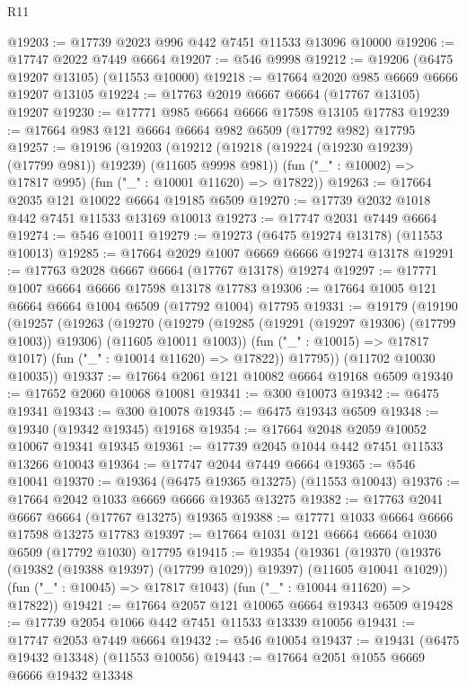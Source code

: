 \begin{lexlean}{R11}
\begin{coremodule}
{{{{{{{{{{{{{{{{{{{{{{{{{{{{{{{{{{{{{{{{{{{{{{{{{{{{{{{{{{{{{{{{{{{{{{{{{{{{{{{{{{@19203 := @17739 @2023 @996 @442 @7451 @11533 @13096 @10000
@19206 := @17747 @2022 @7449 @6664
@19207 := @546 @9998
@19212 := @19206 (@6475 @19207 @13105) (@11553 @10000)
@19218 := @17664 @2020 @985 @6669 @6666 @19207 @13105
@19224 := @17763 @2019 @6667 @6664 (@17767 @13105) @19207
@19230 := @17771 @985 @6664 @6666 @17598 @13105 @17783
@19239 := @17664 @983 @121 @6664 @6664 @982 @6509 (@17792 @982) @17795
@19257 := @19196
    (@19203
      (@19212 (@19218 (@19224 (@19230 @19239) (@17799 @981)) @19239) (@11605 @9998 @981))
      (fun ("_" : @10002) => @17817 @995)
      (fun ("_" : @10001 @11620) => @17822))
@19263 := @17664 @2035 @121 @10022 @6664 @19185 @6509
@19270 := @17739 @2032 @1018 @442 @7451 @11533 @13169 @10013
@19273 := @17747 @2031 @7449 @6664
@19274 := @546 @10011
@19279 := @19273 (@6475 @19274 @13178) (@11553 @10013)
@19285 := @17664 @2029 @1007 @6669 @6666 @19274 @13178
@19291 := @17763 @2028 @6667 @6664 (@17767 @13178) @19274
@19297 := @17771 @1007 @6664 @6666 @17598 @13178 @17783
@19306 := @17664 @1005 @121 @6664 @6664 @1004 @6509 (@17792 @1004) @17795
@19331 := @19179
    (@19190
      (@19257
        (@19263
          (@19270
            (@19279 (@19285 (@19291 (@19297 @19306) (@17799 @1003)) @19306) (@11605 @10011 @1003))
            (fun ("_" : @10015) => @17817 @1017)
            (fun ("_" : @10014 @11620) => @17822))
          @17795))
      (@11702 @10030 @10035))
@19337 := @17664 @2061 @121 @10082 @6664 @19168 @6509
@19340 := @17652 @2060 @10068 @10081
@19341 := @300 @10073
@19342 := @6475 @19341
@19343 := @300 @10078
@19345 := @6475 @19343 @6509
@19348 := @19340 (@19342 @19345) @19168
@19354 := @17664 @2048 @2059 @10052 @10067 @19341 @19345
@19361 := @17739 @2045 @1044 @442 @7451 @11533 @13266 @10043
@19364 := @17747 @2044 @7449 @6664
@19365 := @546 @10041
@19370 := @19364 (@6475 @19365 @13275) (@11553 @10043)
@19376 := @17664 @2042 @1033 @6669 @6666 @19365 @13275
@19382 := @17763 @2041 @6667 @6664 (@17767 @13275) @19365
@19388 := @17771 @1033 @6664 @6666 @17598 @13275 @17783
@19397 := @17664 @1031 @121 @6664 @6664 @1030 @6509 (@17792 @1030) @17795
@19415 := @19354
    (@19361
      (@19370 (@19376 (@19382 (@19388 @19397) (@17799 @1029)) @19397) (@11605 @10041 @1029))
      (fun ("_" : @10045) => @17817 @1043)
      (fun ("_" : @10044 @11620) => @17822))
@19421 := @17664 @2057 @121 @10065 @6664 @19343 @6509
@19428 := @17739 @2054 @1066 @442 @7451 @11533 @13339 @10056
@19431 := @17747 @2053 @7449 @6664
@19432 := @546 @10054
@19437 := @19431 (@6475 @19432 @13348) (@11553 @10056)
@19443 := @17664 @2051 @1055 @6669 @6666 @19432 @13348
}}}}}}}}}}}}}}}}}}}}}}}}}}}}}}}}}}}}}}}}}}}}}}}}}}}}}}}}}}}}}}}}}}}}}}}}}}}}}}}}}}
\end{coremodule}
\end{lexlean}
